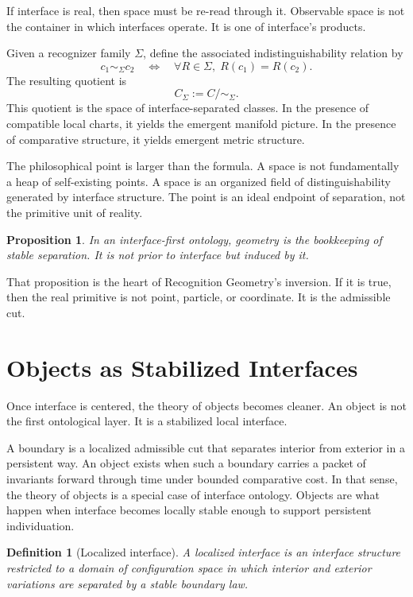 \documentclass[11pt]{article}
\newtheorem{definition}{Definition}
\newtheorem{proposition}{Proposition}
\begin{document}
If interface is real, then space must be re-read through it.
Observable space is not the container in which interfaces operate.
It is one of interface's products.

Given a recognizer family $\Sigma$, define the associated indistinguishability relation by
\[
c_1 \sim_{\Sigma} c_2
\quad \Longleftrightarrow \quad
\forall R \in \Sigma,\; R(c_1)=R(c_2).
\]
The resulting quotient is
\[
C_{\Sigma} := C/{\sim_{\Sigma}}.
\]
This quotient is the space of interface-separated classes.
In the presence of compatible local charts, it yields the emergent manifold picture.
In the presence of comparative structure, it yields emergent metric structure.

The philosophical point is larger than the formula.
A space is not fundamentally a heap of self-existing points.
A space is an organized field of distinguishability generated by interface structure.
The point is an ideal endpoint of separation, not the primitive unit of reality.

\begin{proposition}
In an interface-first ontology, geometry is the bookkeeping of stable separation.
It is not prior to interface but induced by it.
\end{proposition}

\noindent
That proposition is the heart of Recognition Geometry's inversion.
If it is true, then the real primitive is not point, particle, or coordinate.
It is the admissible cut.

\section{Objects as Stabilized Interfaces}

Once interface is centered, the theory of objects becomes cleaner.
An object is not the first ontological layer.
It is a stabilized local interface.

A boundary is a localized admissible cut that separates interior from exterior in a persistent way.
An object exists when such a boundary carries a packet of invariants forward through time under bounded comparative cost.
In that sense, the theory of objects is a special case of interface ontology.
Objects are what happen when interface becomes locally stable enough to support persistent individuation.

\begin{definition}[Localized interface]
A localized interface is an interface structure restricted to a domain of configuration space in which interior and exterior variations are separated by a stable boundary law.
\end{definition}
\end{document}
